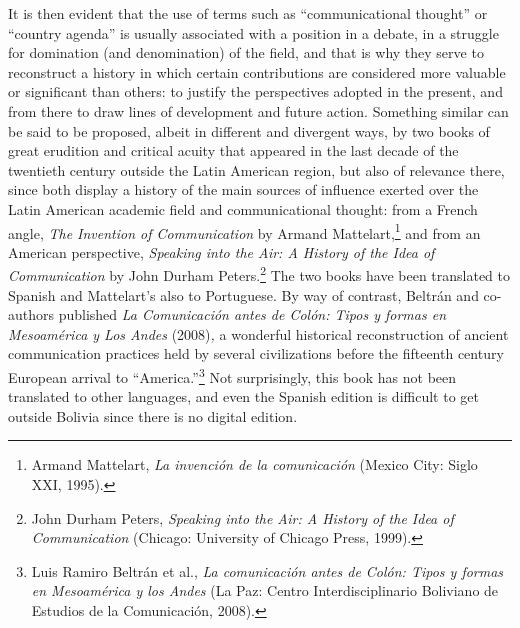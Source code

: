 \documentclass{tufte-handout}
\begin{document}
It is then evident that the use of terms such as ``communicational
thought'' or ``country agenda'' is usually associated with a position in
a debate, in a struggle for domination (and denomination) of the field,
and that is why they serve to reconstruct a history in which certain
contributions are considered more valuable or significant than others:
to justify the perspectives adopted in the present, and from there to
draw lines of development and future action. Something similar can be
said to be proposed, albeit in different and divergent ways, by two
books of great erudition and critical acuity that appeared in the last
decade of the twentieth century outside the Latin American region, but
also of relevance there, since both display a history of the main
sources of influence exerted over the Latin American academic field and
communicational thought: from a French angle, \emph{The Invention of
Communication} by Armand Mattelart,\footnote{Armand Mattelart, \emph{La
  invención de la comunicación} (Mexico City: Siglo XXI, 1995).} and
from an American perspective, \emph{Speaking into the Air: A History of
the Idea of Communication} by John Durham Peters.\footnote{John Durham
  Peters, \emph{Speaking into the Air: A History of the Idea of
  Communication} (Chicago: University of Chicago Press, 1999).} The two
books have been translated to Spanish and Mattelart's also to
Portuguese. By way of contrast, Beltrán and co-authors published
\emph{La Comunicación antes de Colón: Tipos y formas en Mesoamérica y
Los Andes} (2008)\emph{,} a wonderful historical reconstruction of
ancient communication practices held by several civilizations before the
fifteenth century European arrival to ``America.''\footnote{Luis Ramiro
  Beltrán et al., \emph{La comunicación antes de Colón: Tipos y formas
  en Mesoamérica y los Andes} (La Paz: Centro Interdisciplinario
  Boliviano de Estudios de la Comunicación, 2008).} Not surprisingly,
this book has not been translated to other languages, and even the
Spanish edition is difficult to get outside Bolivia since there is no
digital edition.
\end{document}
